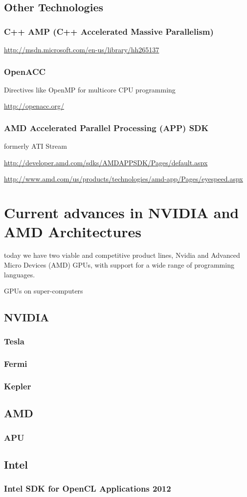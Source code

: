 \subsection{Other Technologies}
\subsubsection{C++ AMP (C++ Accelerated Massive Parallelism)}

\hyperref[C++ AMP MSDN]{http://msdn.microsoft.com/en-us/library/hh265137}

\subsubsection{OpenACC}
Directives like OpenMP for multicore CPU programming

\hyperref[OpenACC]{http://openacc.org/}

\subsubsection{AMD Accelerated Parallel Processing (APP) SDK}
formerly ATI Stream

\hyperref[AMD 1]{http://developer.amd.com/sdks/AMDAPPSDK/Pages/default.aspx}

\hyperref[AMD 2]{http://www.amd.com/us/products/technologies/amd-app/Pages/eyespeed.aspx}

\section{Current advances in NVIDIA and AMD Architectures}
today we have two viable and
competitive product lines, Nvidia and Advanced
Micro Devices (AMD) GPUs, with support for a
wide range of programming languages.

GPUs on super-computers

\subsection{NVIDIA}
\subsubsection{Tesla}
\subsubsection{Fermi}
\subsubsection{Kepler}

\subsection{AMD}
\subsubsection{APU}

\subsection{Intel}
\subsubsection{Intel SDK for OpenCL Applications 2012}

